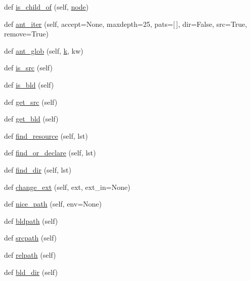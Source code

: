 \begin{DoxyCompactItemize}
def \hyperlink{classwaflib_1_1_node_1_1_node_abc781098e2dcdd15feea5901ea2e23af}{is\+\_\+child\+\_\+of} (self, \hyperlink{structnode}{node})
\item 
def \hyperlink{classwaflib_1_1_node_1_1_node_a06da7a2c94996ada3d100721b5cf831e}{ant\+\_\+iter} (self, accept=None, maxdepth=25, pats=\mbox{[}$\,$\mbox{]}, dir=False, src=True, remove=True)
\item 
def \hyperlink{classwaflib_1_1_node_1_1_node_a5d9b6cac9100b15869f68df28f1d8cb4}{ant\+\_\+glob} (self, \hyperlink{rfft2d_test_m_l_8m_adc468c70fb574ebd07287b38d0d0676d}{k}, kw)
\item 
def \hyperlink{classwaflib_1_1_node_1_1_node_ae47c79cf11fd975ccd2a7316eda8b892}{is\+\_\+src} (self)
\item 
def \hyperlink{classwaflib_1_1_node_1_1_node_ac800b56240d593327ff3f3f17c58313d}{is\+\_\+bld} (self)
\item 
def \hyperlink{classwaflib_1_1_node_1_1_node_a7f7ca00eb49c81382a69e032b5229ea6}{get\+\_\+src} (self)
\item 
def \hyperlink{classwaflib_1_1_node_1_1_node_a181e1ee8473df6b270153d1b071d4dc0}{get\+\_\+bld} (self)
\item 
def \hyperlink{classwaflib_1_1_node_1_1_node_a72b22d40cbdffb458638abb21d706ff8}{find\+\_\+resource} (self, lst)
\item 
def \hyperlink{classwaflib_1_1_node_1_1_node_aca7db00cba3cae363d3b5f689ce10828}{find\+\_\+or\+\_\+declare} (self, lst)
\item 
def \hyperlink{classwaflib_1_1_node_1_1_node_a6b0cb5708818ef6483466202ece39049}{find\+\_\+dir} (self, lst)
\item 
def \hyperlink{classwaflib_1_1_node_1_1_node_ad8e6f438a9b4e34994c8ef82c3b7649d}{change\+\_\+ext} (self, ext, ext\+\_\+in=None)
\item 
def \hyperlink{classwaflib_1_1_node_1_1_node_a84dd8d16929674c2a4dadcc078d9d314}{nice\+\_\+path} (self, env=None)
\item 
def \hyperlink{classwaflib_1_1_node_1_1_node_a1e67abe7b66ef0abd91795547e14a7b7}{bldpath} (self)
\item 
def \hyperlink{classwaflib_1_1_node_1_1_node_a135bd20c340d064fb59d2c8f329fec50}{srcpath} (self)
\item 
def \hyperlink{classwaflib_1_1_node_1_1_node_a4bc57e86dc18da4ce8fc9a669a829186}{relpath} (self)
\item 
def \hyperlink{classwaflib_1_1_node_1_1_node_ae2103a3fade78458d40298173d7179a3}{bld\+\_\+dir} (self)
\item 

\end{DoxyCompactItemize}
